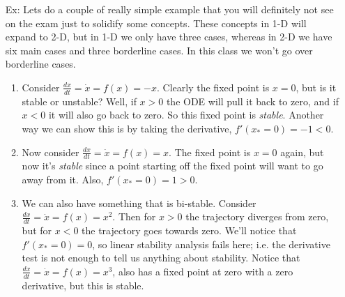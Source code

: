\documentclass[reqno]{amsart}
\theoremstyle{definition}
\begin{document}
\begin{enumerate}

\item[Ex:  ]  Lets do a couple of really simple example that you will definitely not see on the exam
just to solidify some concepts.  These concepts in 1-D will expand to 2-D, but in 1-D we only have
three cases, whereas in 2-D we have six main cases and three borderline cases.  In this class we won't
go over borderline cases.

\begin{enumerate}

\item  Consider $\frac{dx}{dt} = \dot{x} = f(x) = -x$.  Clearly the fixed point is $x=0$, but is it stable or
unstable?  Well, if $x > 0$ the ODE will pull it back to zero, and if $x < 0$ it will also go back to zero.
So this fixed point is \emph{stable}.  Another way we can show this is by taking the derivative,
$f'(x_* = 0) = -1 < 0$.

\item  Now consider $\frac{dx}{dt} = \dot{x} = f(x) = x$.  The fixed point is $x = 0$ again, but
now it's \emph{stable} since a point starting off the fixed point will want to go away from it.  Also,
$f'(x_* = 0) = 1 > 0$.

\item  We can also have something that is bi-stable.  Consider $\frac{dx}{dt} = \dot{x} = f(x) = x^2$.
Then for $x > 0$ the trajectory diverges from zero, but for $x < 0$ the trajectory goes towards zero.
We'll notice that $f'(x_* = 0) = 0$, so linear stability analysis fails here; i.e. the derivative test is not
enough to tell us anything about stability.  Notice that $\frac{dx}{dt} = \dot{x} = f(x) = x^3$, also
has a fixed point at zero with a zero derivative, but this is stable.

\end{enumerate}


\end{enumerate}
\end{document}
